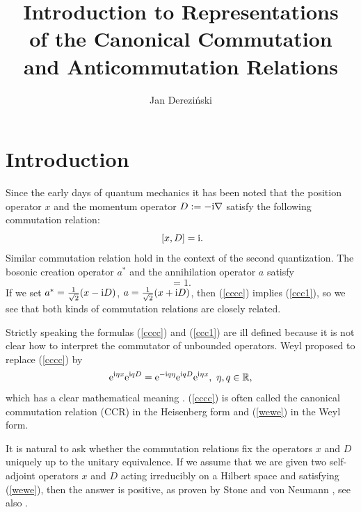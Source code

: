 \documentclass{svmult}
\newcommand{\beq}{\begin{equation}}
\newcommand{\eeq}{\end{equation}}
\def\rr{{\mathbb R}}
\def\i{{\rm i}}
\def\e{{\rm e}}
\def\e{{\rm e}}
\begin{document}
\title*{Introduction to Representations \\
of the Canonical Commutation \\
and Anticommutation Relations}
\author{Jan Derezi\'{n}ski}

\maketitle
\setcounter{minitocdepth}{2}

\section{Introduction}

Since the early days of quantum mechanics it has been noted that the position
operator $x$ and the momentum operator $D:=-\i\nabla$ satisfy
the following commutation relation:
\beq \ [x,D]=\i.\label{cccc}\eeq
Similar commutation relation hold in the context of the second
quantization.  The bosonic creation
operator $a^*$ and the annihilation operator
$a$ satisfy
\beq [a,a^*]=1.\label{ccc1}\eeq
If we set $a^*=\frac1{\sqrt2}(x-\i D)$, $a=\frac1{\sqrt2}(x+\i D)$, then
 (\ref{cccc}) implies
 (\ref{ccc1}), so we see that both kinds of commutation relations are closely
related.  


Strictly speaking the formulas (\ref{cccc}) and (\ref{ccc1}) are ill defined because it is not
clear how to interpret the commutator of unbounded operators. Weyl proposed to
replace (\ref{cccc}) by
\beq
\e^{\i \eta x}\e^{\i q D}=\e^{-\i q\eta}\e^{\i q D}\e^{\i \eta x},\ \eta,q\in\rr,
\label{wewe}\eeq
which has a clear mathematical meaning \cite{Weyl}.  (\ref{cccc})
is often called the canonical commutation relation (CCR)
 in the Heisenberg form and (\ref{wewe}) in the Weyl form.

It is natural to ask whether the commutation relations fix the operators $x$
and $D$ uniquely up to the
 unitary equivalence. If we assume that we are given  two self-adjoint
operators $x$ and $D$  acting
irreducibly on a Hilbert space and
satisfying (\ref{wewe}), then the answer is positive,
as proven by Stone and von  Neumann  \cite{vN}, see also \cite{Su}.
\end{document}
